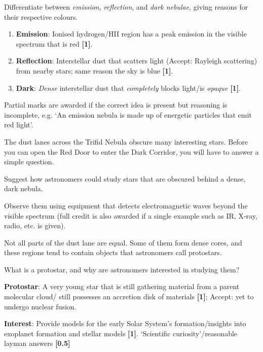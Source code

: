 \documentclass[a4paper,11pt,draft]{exam}
\begin{document}
\begin{questions}
\question[3]
	Differentiate between \textit{emission}, \textit{reflection}, and \textit{dark nebulae}, giving reasons for their respective colours.
	\droppoints
	\begin{solution}
		\begin{enumerate}[leftmargin=12pt]
			\item \textbf{Emission}: Ionised hydrogen/HII region has a peak emission in the visible spectrum that is red \textbf{[1]}.
			\item \textbf{Reflection}: Interstellar dust that scatters light (Accept: Rayleigh scattering) from nearby stars; same reason the sky is blue \textbf{[1]}.
			\item \textbf{Dark}: \textit{Dense} interstellar dust that \textit{completely} blocks light/is \textit{opaque} \textbf{[1]}.
		\end{enumerate}
		Partial marks are awarded if the correct idea is present but reasoning is incomplete, e.g. `An emission nebula is made up of energetic particles that emit red light'.
	\end{solution}

\filbreak	
\question[1]
	The dust lanes across the Trifid Nebula obscure many interesting stars. Before you can open the Red Door to enter the Dark Corridor, you will have to answer a simple question.
	
	Suggest how astronomers could study stars that are obscured behind a dense, dark nebula.
	\droppoints
	\begin{solution}
		Observe them using equipment that detects electromagnetic waves beyond the visible spectrum (full credit is also awarded if a single example such as IR, X-ray, radio, etc. is given).
	\end{solution}
	
\question[2]
	Not all parts of the dust lane are equal. Some of them form dense cores, and these regions tend to contain objects that astronomers call protostars.
	
	What is a protostar, and why are astronomers interested in studying them?
	\droppoints
	\begin{solution}
		\textbf{Protostar}: A very young star that is still gathering material from a parent molecular cloud/ still possesses an accretion disk of materials \textbf{[1]};  
		Accept: yet to undergo nuclear fusion.
		
		\textbf{Interest}: Provide models for the early Solar System’s formation/insights into exoplanet formation and stellar models \textbf{[1]}. ‘Scientific curiosity’/reasonable layman answers \textbf{[0.5]}
	\end{solution}
	

\end{questions}
\end{document}
